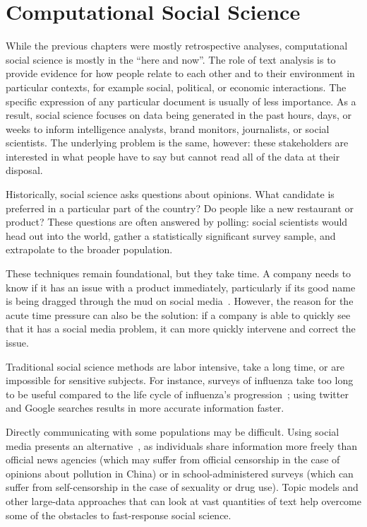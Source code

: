 
\chapter{Computational Social Science}
\label{ch:css}

While the previous chapters were mostly retrospective analyses, computational
social science is mostly in the ``here and now''.  
The role of text analysis is to provide evidence for how people relate to each other and to their environment in particular contexts, for example social, political, or economic interactions.
The specific expression of any particular document is usually of less importance.
As a result, social science focuses on data
being generated in the past hours, days, or weeks to inform
intelligence analysts, brand monitors, journalists, or social
scientists.  The underlying problem is the same, however: these
stakeholders are interested in what people have to say but cannot read
all of the data at their disposal.

Historically, social science asks questions about opinions. What candidate is
preferred in a particular part of the country? Do people like a
new restaurant or product?  These questions are often answered by
polling: social scientists would head out into the world, gather a
statistically significant survey sample, and extrapolate to the
broader population.

These techniques remain foundational, but they take time.  A
company needs to know if it has an issue with a product immediately,
particularly if its good name is being dragged through the mud on
social media~\cite{bowen-16}.  However, the reason for the acute time
pressure can also be the solution: if a company is able to quickly see
that it has a social media problem, it can more quickly intervene and
correct the issue.

Traditional social science methods are labor intensive, take a long
time, or are impossible for sensitive subjects.  For instance, surveys
of influenza take too long to be useful compared to the life cycle of
influenza's progression~\cite{broniatowsky-15}; using twitter and
Google searches results in more accurate information faster.

Directly communicating with some
populations may be difficult.  Using social media presents an
alternative~\cite{wang:paul:dredze-15}, as individuals share
information more freely than official news agencies (which may suffer
from official censorship in the case of opinions about pollution in China) or in
school-administered surveys (which can suffer from self-censorship in
the case of sexuality or drug use).  Topic models and other large-data approaches
that can look at vast quantities of text help overcome some of the
obstacles to fast-response social science.

